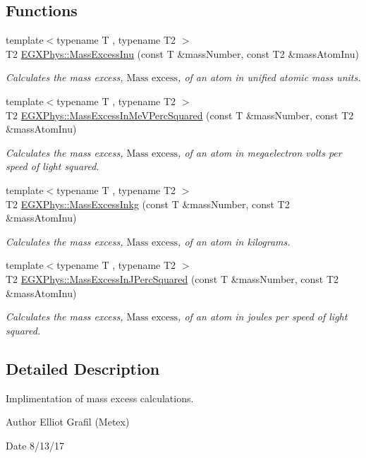 \subsection*{Functions}
\begin{DoxyCompactItemize}
\item 
{\footnotesize template$<$typename T , typename T2 $>$ }\\T2 \mbox{\hyperlink{group___mass_excess_ga61c6f557bd742126c0c76e88cf7740ad}{E\+G\+X\+Phys\+::\+Mass\+Excess\+Inu}} (const T \&mass\+Number, const T2 \&mass\+Atom\+Inu)
\begin{DoxyCompactList}\small\item\em Calculates the mass excess, $\text{Mass excess}$, of an atom in unified atomic mass units. \end{DoxyCompactList}\item 
{\footnotesize template$<$typename T , typename T2 $>$ }\\T2 \mbox{\hyperlink{group___mass_excess_ga99a93b88df3425b7a153c32c05fa5a88}{E\+G\+X\+Phys\+::\+Mass\+Excess\+In\+Me\+V\+Perc\+Squared}} (const T \&mass\+Number, const T2 \&mass\+Atom\+Inu)
\begin{DoxyCompactList}\small\item\em Calculates the mass excess, $\text{Mass excess}$, of an atom in megaelectron volts per speed of light squared. \end{DoxyCompactList}\item 
{\footnotesize template$<$typename T , typename T2 $>$ }\\T2 \mbox{\hyperlink{group___mass_excess_gab72a3640886092be8b9c9662020a2306}{E\+G\+X\+Phys\+::\+Mass\+Excess\+Inkg}} (const T \&mass\+Number, const T2 \&mass\+Atom\+Inu)
\begin{DoxyCompactList}\small\item\em Calculates the mass excess, $\text{Mass excess}$, of an atom in kilograms. \end{DoxyCompactList}\item 
{\footnotesize template$<$typename T , typename T2 $>$ }\\T2 \mbox{\hyperlink{group___mass_excess_ga3eb487f438543e950b9c5aece4c5b409}{E\+G\+X\+Phys\+::\+Mass\+Excess\+In\+J\+Perc\+Squared}} (const T \&mass\+Number, const T2 \&mass\+Atom\+Inu)
\begin{DoxyCompactList}\small\item\em Calculates the mass excess, $\text{Mass excess}$, of an atom in joules per speed of light squared. \end{DoxyCompactList}\end{DoxyCompactItemize}


\subsection{Detailed Description}
Implimentation of mass excess calculations. 

\begin{DoxyAuthor}{Author}
Elliot Grafil (Metex) 
\end{DoxyAuthor}
\begin{DoxyDate}{Date}
8/13/17 
\end{DoxyDate}
